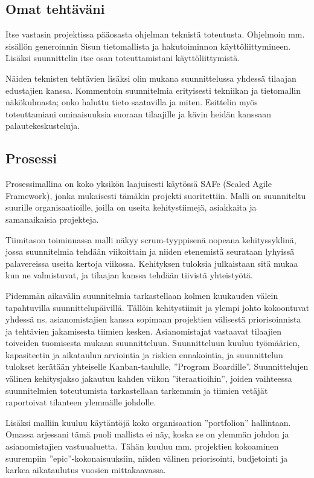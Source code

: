 \documentclass{article}
\begin{document}
\subsection{Omat tehtäväni}

Itse vastasin projektissa pääosasta ohjelman teknistä toteutusta. Ohjelmoin mm.
sisällön generoinnin Sisun tietomallista ja hakutoiminnon käyttöliittymineen.
Lisäksi suunnittelin itse osan toteuttamistani käyttöliittymistä.

Näiden teknisten tehtävien lisäksi olin mukana suunnittelussa yhdessä tilaajan
edustajien kanssa. Kommentoin suunnitelmia erityisesti tekniikan ja tietomallin
näkökulmasta; onko haluttu tieto saa\-ta\-vil\-la ja mi\-ten. Esittelin myös
toteuttamiani ominaisuuksia suoraan tilaajille ja kävin heidän kans\-saan
palaute\-kes\-kus\-teluja.

\subsection{Prosessi}

Prosessimallina on koko yksikön laajuisesti käytössä SAFe (Scaled Agile
Framework), jonka mu\-kai\-ses\-ti tämäkin projekti suoritettiin. Malli on
suunniteltu suurille organisaatioille, joilla on useita kehitystiimejä,
asiakkaita ja samanaikaisia projekteja.

Tiimitason toiminnassa malli näkyy scrum-tyyppisenä nopeana kehityssyklinä,
jossa suunnitelmia tehdään viikoittain ja niiden etenemistä seurataan lyhyissä
palavereissa useita kertoja viikossa. Kehityksen tuloksia julkaistaan sitä
mukaa kun ne valmistuvat, ja tilaajan kanssa tehdään tiivistä yhteis\-työtä.

Pidemmän aikavälin suunnitelmia tarkastellaan kolmen kuukauden välein
tapahtuvilla suunnittelu\-päivillä. Tällöin kehitystiimit ja ylempi johto
kokoontuvat yhdessä ns. asianomistajien kanssa sopimaan projektien välisestä
priorisoinnista ja tehtävien jakamisesta tiimien kesken. Asianomistajat
vastaavat tilaajien toiveiden tuomisesta mukaan suunnitteluun. Suunnitteluun
kuuluu työmäärien, kapasiteetin ja aikataulun arviointia ja riskien
ennakointia, ja suunnittelun tulokset kerätään yhtei\-selle Kanban-taululle,
''Program Boardille''.  Suunnittelujen välinen kehitysjakso jakautuu kahden
viikon ''iteraatioihin'', joiden vaihteessa suunnitelmien toteutumista
tarkastellaan tarkemmin ja tii\-mien vetä\-jät raportoivat tilanteen ylemmälle
johdolle.

Lisäksi malliin kuuluu käytäntöjä koko organisaation ''portfolion'' hallintaan.
Omassa arjessani tämä puoli mallista ei näy, koska se on ylemmän johdon ja
asianomistajien vastuualuetta. Tähän kuuluu mm. projektien kokoaminen
suurempiin ''epic''-kokonaisuuksiin, niiden välinen priorisointi, budjetointi
ja karkea aikataulutus vuosien mittakaavassa.
\end{document}
